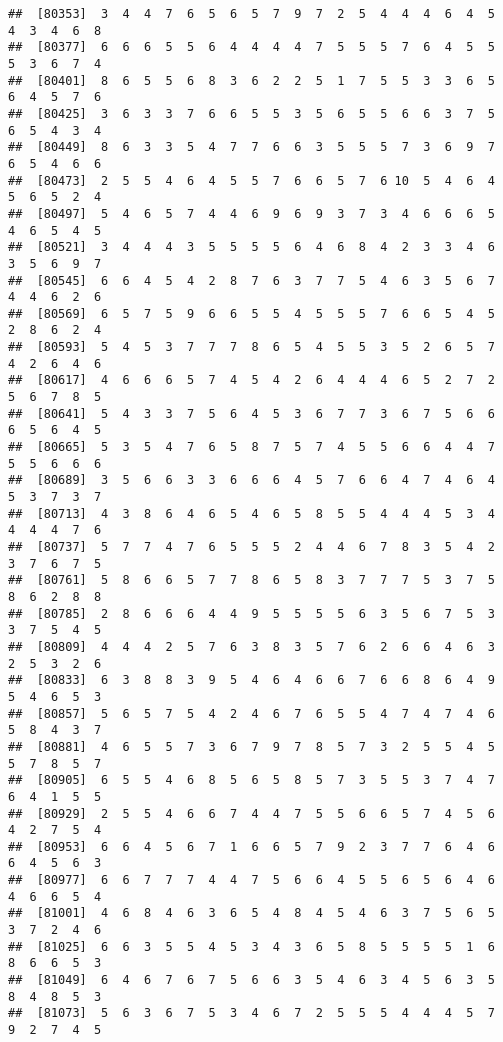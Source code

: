 \documentclass[
]{book}
\begin{document}
\begin{verbatim}
##  [80353]  3  4  4  7  6  5  6  5  7  9  7  2  5  4  4  4  6  4  5  4  3  4  6  8
##  [80377]  6  6  6  5  5  6  4  4  4  4  7  5  5  5  7  6  4  5  5  5  3  6  7  4
##  [80401]  8  6  5  5  6  8  3  6  2  2  5  1  7  5  5  3  3  6  5  6  4  5  7  6
##  [80425]  3  6  3  3  7  6  6  5  5  3  5  6  5  5  6  6  3  7  5  6  5  4  3  4
##  [80449]  8  6  3  3  5  4  7  7  6  6  3  5  5  5  7  3  6  9  7  6  5  4  6  6
##  [80473]  2  5  5  4  6  4  5  5  7  6  6  5  7  6 10  5  4  6  4  5  6  5  2  4
##  [80497]  5  4  6  5  7  4  4  6  9  6  9  3  7  3  4  6  6  6  5  4  6  5  4  5
##  [80521]  3  4  4  4  3  5  5  5  5  6  4  6  8  4  2  3  3  4  6  3  5  6  9  7
##  [80545]  6  6  4  5  4  2  8  7  6  3  7  7  5  4  6  3  5  6  7  4  4  6  2  6
##  [80569]  6  5  7  5  9  6  6  5  5  4  5  5  5  7  6  6  5  4  5  2  8  6  2  4
##  [80593]  5  4  5  3  7  7  7  8  6  5  4  5  5  3  5  2  6  5  7  4  2  6  4  6
##  [80617]  4  6  6  6  5  7  4  5  4  2  6  4  4  4  6  5  2  7  2  5  6  7  8  5
##  [80641]  5  4  3  3  7  5  6  4  5  3  6  7  7  3  6  7  5  6  6  6  5  6  4  5
##  [80665]  5  3  5  4  7  6  5  8  7  5  7  4  5  5  6  6  4  4  7  5  5  6  6  6
##  [80689]  3  5  6  6  3  3  6  6  6  4  5  7  6  6  4  7  4  6  4  5  3  7  3  7
##  [80713]  4  3  8  6  4  6  5  4  6  5  8  5  5  4  4  4  5  3  4  4  4  4  7  6
##  [80737]  5  7  7  4  7  6  5  5  5  2  4  4  6  7  8  3  5  4  2  3  7  6  7  5
##  [80761]  5  8  6  6  5  7  7  8  6  5  8  3  7  7  7  5  3  7  5  8  6  2  8  8
##  [80785]  2  8  6  6  6  4  4  9  5  5  5  5  6  3  5  6  7  5  3  3  7  5  4  5
##  [80809]  4  4  4  2  5  7  6  3  8  3  5  7  6  2  6  6  4  6  3  2  5  3  2  6
##  [80833]  6  3  8  8  3  9  5  4  6  4  6  6  7  6  6  8  6  4  9  5  4  6  5  3
##  [80857]  5  6  5  7  5  4  2  4  6  7  6  5  5  4  7  4  7  4  6  5  8  4  3  7
##  [80881]  4  6  5  5  7  3  6  7  9  7  8  5  7  3  2  5  5  4  5  5  7  8  5  7
##  [80905]  6  5  5  4  6  8  5  6  5  8  5  7  3  5  5  3  7  4  7  6  4  1  5  5
##  [80929]  2  5  5  4  6  6  7  4  4  7  5  5  6  6  5  7  4  5  6  4  2  7  5  4
##  [80953]  6  6  4  5  6  7  1  6  6  5  7  9  2  3  7  7  6  4  6  6  4  5  6  3
##  [80977]  6  6  7  7  7  4  4  7  5  6  6  4  5  5  6  5  6  4  6  4  6  6  5  4
##  [81001]  4  6  8  4  6  3  6  5  4  8  4  5  4  6  3  7  5  6  5  3  7  2  4  6
##  [81025]  6  6  3  5  5  4  5  3  4  3  6  5  8  5  5  5  5  1  6  8  6  6  5  3
##  [81049]  6  4  6  7  6  7  5  6  6  3  5  4  6  3  4  5  6  3  5  8  4  8  5  3
##  [81073]  5  6  3  6  7  5  3  4  6  7  2  5  5  5  4  4  4  5  7  9  2  7  4  5

\end{verbatim}
\end{document}
